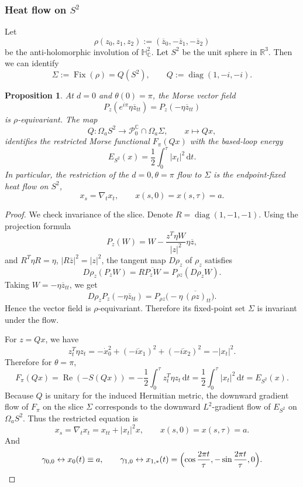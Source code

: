 \documentclass[11pt]{amsart}
\theoremstyle{plain}
\newtheorem{prop}[thm]{Proposition}
\theoremstyle{definition}
\newcommand{\R}{\mathbb{R}}
\newcommand{\C}{\mathbb{C}}
\newcommand{\dd}{\mathrm d}
\newcommand{\HH}{\mathbb{H}}
\DeclareMathOperator{\re}{Re}
\DeclareMathOperator{\diag}{diag}
\begin{document}
\subsubsection{Heat flow on $S^2$}\label{sec:heat flow on S2}
Let
\[
\rho(z_0,z_1,z_2):=(\overline z_0,-\overline z_1,-\overline z_2)
\]
be the anti-holomorphic involution of $\HH^2_{\C}$. Let $S^2$ be the unit sphere in $\R^3$. Then we can identify 
\[
\Sigma:=\operatorname{Fix}(\rho)=Q(S^2),\qquad Q:=\operatorname{diag}(1,-i,-i).
\]

\begin{prop}
At $d=0$ and $\theta(0)=\pi$, the Morse vector field
\[
P_z(e^{i\pi}\eta \overline{z}_{tt})
=P_z(-\eta\overline{z}_{tt})
\]
is $\rho$-equivariant. The map
\[
Q:\Omega_aS^2\longrightarrow \mathcal P^{\C}_0\cap \Omega_a\Sigma,
\qquad x\longmapsto Qx,
\]
identifies the restricted Morse functional $F_{\pi}(Qx)$ with the based-loop energy
\[
E_{S^2}(x)=\frac12\int_0^\tau |x_t|^2\,\dd t.
\]
In particular, the restriction of the $d=0,\theta=\pi$ flow to $\Sigma$ is the endpoint-fixed heat flow on $S^2$,
\[
x_s=\nabla_t x_t,\qquad x(s,0)=x(s,\tau)=a.
\]
\end{prop}

\begin{proof}
We check invariance of the slice. Denote $R=\diag(1,-1,-1)$.
Using the projection formula
\[
P_z(W)=W-\frac{z^T\eta W}{|z|^2}\eta\overline z,
\]
and $R^T\eta R=\eta$, $|R\bar{z}|^2=|z|^2$,  the tangent map $D\rho_z$ of $\rho_z$ satisfies
\[
D\rho_z(P_zW)=R\overline{P_zW}=P_{\rho z}(D\rho_zW).
\]
Taking $W=-\eta\overline z_{tt}$, we get
\[
D\rho_zP_{z}(-\eta\bar{z}_{tt})
=
P_{\rho z}\bigl(-\eta\,\overline{(\rho z)}_{tt}\bigr).
\]
Hence the vector field is $\rho$-equivariant. Therefore its fixed-point set $\Sigma$ is invariant under the flow.

For $z=Qx$, we have
\[
z_t^T\eta z_t
=
-\dot x_0^2+(-i\dot x_1)^2+(-i\dot x_2)^2
=
-|x_t|^2.
\]
Therefore for $\theta=\pi$,
\[
F_{\pi}(Qx)=\re(-S(Qx))
=-
\frac12\int_0^\tau z_t^T\eta z_t\,\dd t
=
\frac12\int_0^\tau |x_t|^2\,\dd t=E_{S^2}(x).
\]
Because $Q$ is unitary for the induced Hermitian metric, the downward gradient flow of $F_\pi$ on the slice $\Sigma$ corresponds to the downward $L^2$-gradient flow of $E_{S^2}$ on $\Omega_aS^2$. Thus the restricted equation is
\begin{equation*}
 x_s=\nabla_t x_t=x_{tt}+|x_t|^2x,
 \qquad x(s,0)=x(s,\tau)=a.
\end{equation*}
And \[
\gamma_{0,0}\leftrightarrow x_0(t)\equiv a,
\qquad
\gamma_{1,0}\leftrightarrow x_{1,*}(t)=\Bigl(\cos\frac{2\pi t}{\tau},-\sin\frac{2\pi t}{\tau},0\Bigr). \qedhere
\]
\end{proof}
\end{document}
